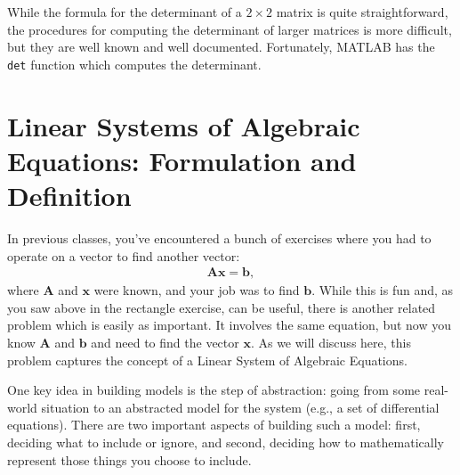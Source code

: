 While the formula for the determinant of a $2\times 2$ matrix is quite straightforward, the procedures for computing the determinant of larger matrices is more difficult, but they are well known and well documented.  Fortunately, MATLAB has the \texttt{det} function which computes the determinant.

\section{Linear Systems of Algebraic Equations: Formulation and Definition}

In previous classes, you've encountered a bunch of exercises where you had to operate on a vector to find another vector:
\begin{align}
\mathbf{A}\mathbf{x} = \mathbf{b},
\end{align}
where $\mathbf{A}$ and $\mathbf{x}$ were known, and your job was to find $\mathbf{b}$.  While this is fun and, as you saw above in the rectangle exercise, can be useful, there is another related problem which is easily as important.  It involves the same equation, but now you know $\mathbf{A}$ and $\mathbf{b}$ and need to find the vector $\mathbf{x}$.  As we will discuss here, this problem captures the concept of a Linear System of Algebraic Equations.

One key idea in building models is the step of abstraction: going from some real-world situation to an abstracted model for the system (e.g., a set of differential equations).  There are two important aspects of building such a model: first, deciding what to include or ignore, and second, deciding how to mathematically represent those things you choose to include.

